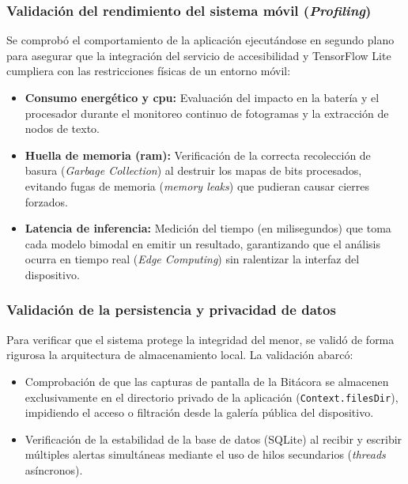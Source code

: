 \subsubsection{Validación del rendimiento del sistema móvil (\textit{Profiling})}
Se comprobó el comportamiento de la aplicación ejecutándose en segundo plano para asegurar que la integración del servicio de accesibilidad y TensorFlow Lite cumpliera con las restricciones físicas de un entorno móvil:
\begin{itemize}
    \item \textbf{Consumo energético y \gls{cpu}:} Evaluación del impacto en la batería y el procesador durante el monitoreo continuo de fotogramas y la extracción de nodos de texto.
    \item \textbf{Huella de memoria (\gls{ram}):} Verificación de la correcta recolección de basura (\textit{Garbage Collection}) al destruir los mapas de bits procesados, evitando fugas de memoria (\textit{memory leaks}) que pudieran causar cierres forzados.
    \item \textbf{Latencia de inferencia:} Medición del tiempo (en milisegundos) que toma cada modelo bimodal en emitir un resultado, garantizando que el análisis ocurra en tiempo real (\textit{Edge Computing}) sin ralentizar la interfaz del dispositivo.
\end{itemize}

\subsubsection{Validación de la persistencia y privacidad de datos}
Para verificar que el sistema protege la integridad del menor, se validó de forma rigurosa la arquitectura de almacenamiento local. La validación abarcó:
\begin{itemize}
    \item Comprobación de que las capturas de pantalla de la Bitácora se almacenen exclusivamente en el directorio privado de la aplicación (\texttt{Context.filesDir}), impidiendo el acceso o filtración desde la galería pública del dispositivo.
    \item Verificación de la estabilidad de la base de datos (SQLite) al recibir y escribir múltiples alertas simultáneas mediante el uso de hilos secundarios (\textit{threads} asíncronos).
\end{itemize}

